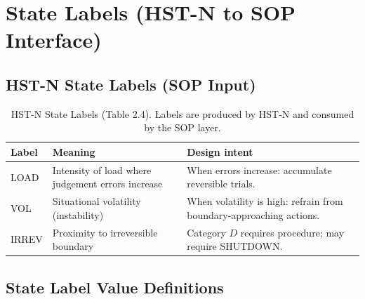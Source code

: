
\section{State Labels (HST-N to SOP Interface)}
\label{sec:state-labels-c2}


\subsection{HST-N State Labels (SOP Input)}
\label{sec:hstn-state-labels-c2}

\begin{table}[ht]
\centering
\small
\begin{tabularx}{\linewidth}{lXX}
\toprule
\textbf{Label} & \textbf{Meaning} & \textbf{Design intent} \\
\midrule
LOAD
& Intensity of load where judgement errors increase
& When errors increase: accumulate reversible trials. \\
VOL
& Situational volatility (instability)
& When volatility is high: refrain from boundary-approaching
actions. \\
IRREV
& Proximity to irreversible boundary
& Category $D$ requires procedure; may require SHUTDOWN. \\
\bottomrule
\end{tabularx}
\caption[HST-N State Labels (SOP Input)]{HST-N State Labels (Table
2.4). Labels are produced by HST-N and consumed by the SOP layer.}
\label{tab:hstn-state-labels-c2}
\end{table}

\subsection{State Label Value Definitions}
\label{sec:hstn-state-label-values-c2}

